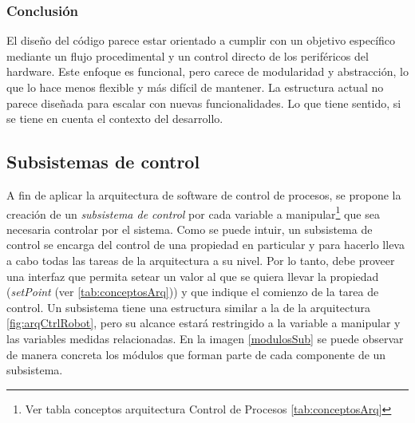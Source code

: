 \subsubsection*{Conclusión}

El diseño del código parece estar orientado a cumplir con un objetivo específico mediante un flujo procedimental y un control directo de los periféricos del hardware. Este enfoque es funcional, pero carece de modularidad y abstracción, lo que lo hace menos flexible y más difícil de mantener. La estructura actual no parece diseñada para escalar con nuevas funcionalidades. Lo que tiene sentido, si se tiene en cuenta el contexto del desarrollo.




\subsection{Subsistemas de control}

A fin de aplicar la arquitectura de software de control de procesos, se propone la creación de un \textit{subsistema de control} por cada variable a manipular\footnote{Ver tabla conceptos arquitectura Control de Procesos \ref{tab:conceptosArq}} que sea necesaria controlar por el sistema. Como se puede intuir, un subsistema de control se encarga del control de una propiedad en particular y para hacerlo lleva a cabo todas las tareas de la arquitectura a su nivel. Por lo tanto, debe proveer una interfaz que permita setear un valor al que se quiera llevar la propiedad (\textit{setPoint} (ver  \ref{tab:conceptosArq})) y que indique el comienzo de la tarea de control. Un subsistema tiene una estructura similar a la de la arquitectura \ref{fig:arqCtrlRobot}, pero su alcance estará restringido a la variable a manipular y las variables medidas relacionadas. En la imagen \ref{modulosSub} se puede observar de manera concreta los módulos que forman parte de cada componente de un subsistema.


